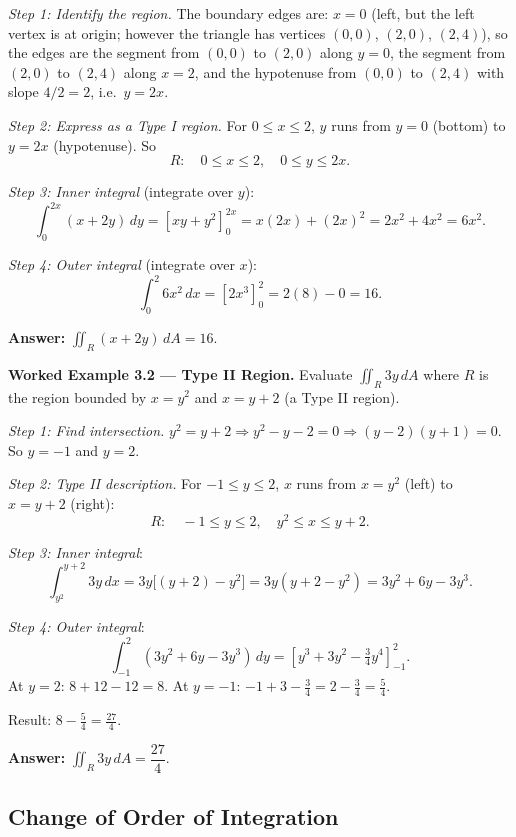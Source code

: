 \documentclass[12pt,a4paper]{article}
\begin{document}
\textit{Step 1: Identify the region.} The boundary edges are: \(x=0\) (left, but the left vertex is at origin; however the triangle has vertices \((0,0)\), \((2,0)\), \((2,4)\)), so the edges are the segment from \((0,0)\) to \((2,0)\) along \(y=0\), the segment from \((2,0)\) to \((2,4)\) along \(x=2\), and the hypotenuse from \((0,0)\) to \((2,4)\) with slope \(4/2=2\), i.e.\ \(y=2x\).

\textit{Step 2: Express as a Type I region.} For \(0 \le x \le 2\), \(y\) runs from \(y=0\) (bottom) to \(y=2x\) (hypotenuse). So
\[
  R:\quad 0 \le x \le 2,\quad 0 \le y \le 2x.
\]

\textit{Step 3: Inner integral} (integrate over \(y\)):
\[
  \int_0^{2x}(x+2y)\,dy = \left[xy + y^2\right]_0^{2x} = x(2x) + (2x)^2 = 2x^2 + 4x^2 = 6x^2.
\]

\textit{Step 4: Outer integral} (integrate over \(x\)):
\[
  \int_0^2 6x^2\,dx = \left[2x^3\right]_0^2 = 2(8) - 0 = 16.
\]

\textbf{Answer:} \(\displaystyle\iint_R (x+2y)\,dA = 16\).

\vspace{4pt}
\textbf{Worked Example 3.2 --- Type II Region.}
Evaluate \(\displaystyle\iint_R 3y\,dA\) where \(R\) is the region bounded by \(x = y^2\) and \(x = y + 2\) (a Type II region).

\textit{Step 1: Find intersection.} \(y^2 = y+2 \Rightarrow y^2-y-2=0 \Rightarrow (y-2)(y+1)=0\). So \(y = -1\) and \(y = 2\).

\textit{Step 2: Type II description.} For \(-1 \le y \le 2\), \(x\) runs from \(x = y^2\) (left) to \(x = y+2\) (right):
\[
  R:\quad -1 \le y \le 2,\quad y^2 \le x \le y+2.
\]

\textit{Step 3: Inner integral}:
\[
  \int_{y^2}^{y+2} 3y\,dx = 3y\bigl[(y+2)-y^2\bigr] = 3y(y+2-y^2) = 3y^2 + 6y - 3y^3.
\]

\textit{Step 4: Outer integral}:
\[
  \int_{-1}^{2}(3y^2+6y-3y^3)\,dy = \left[y^3 + 3y^2 - \tfrac{3}{4}y^4\right]_{-1}^{2}.
\]
At \(y=2\): \(8 + 12 - 12 = 8\). At \(y=-1\): \(-1+3 - \tfrac{3}{4} = 2 - \tfrac{3}{4} = \tfrac{5}{4}\).

Result: \(8 - \tfrac{5}{4} = \tfrac{27}{4}\).

\textbf{Answer:} \(\displaystyle\iint_R 3y\,dA = \dfrac{27}{4}\).

\subsection{Change of Order of Integration}
\end{document}

